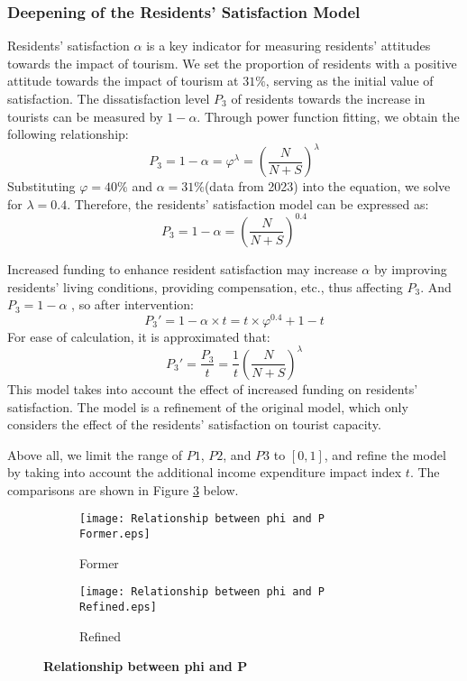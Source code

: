 \documentclass{mcmthesis}
\begin{document}
\subsubsection{Deepening of the Residents' Satisfaction Model}
{Residents' satisfaction $\alpha$ is a key indicator
for measuring residents' attitudes towards the impact of tourism. We set the
proportion of residents with a positive attitude towards the impact of
tourism at $31\%$, serving as the initial value of
satisfaction. The dissatisfaction level $P_3$ of residents towards the increase in
tourists can be measured by $1-\alpha$. Through power function fitting, we obtain
the following relationship:}
\begin{equation}
  P_3=1-\alpha=\varphi^\lambda =\left(\frac{N}{N+S}\right)^\lambda
\end{equation}
{Substituting $\varphi =40\%$ and $\alpha =31\%$(data from 2023) into the equation,
we solve for $\lambda =0.4$. Therefore, the
residents' satisfaction model can be expressed
as:}
\begin{equation}
  P_3=1-\alpha=\left(\frac{N}{N+S}\right)^{0.4}
\end{equation}

{Increased funding to enhance resident satisfaction may increase $\alpha$ by improving residents' living conditions, providing compensation, etc., thus affecting $P_3$. And $P_3=1-\alpha$ , so after intervention:}
\begin{equation}
  P_3'=1-\alpha \times t=t \times \varphi ^{0.4}+1-t
\end{equation}
{For ease of calculation, it is approximated that:}
\begin{equation}
P_3'=\frac{P_3}{t}=\frac{1}{t}\left(\frac{N}{N+S}\right)^\lambda\label{eq:p3}
\end{equation}
{This model takes into account the effect of increased funding on residents' satisfaction. The model is a refinement of the original model, which only considers the effect of the residents' satisfaction on tourist capacity.}

{Above all, we limit the range of $P1$, $P2$, and $P3$ to $[0,1]$, and refine the model by taking into account the additional income expenditure impact index $t$. The comparisons are shown in Figure \ref{fig:Figure7} below.}
\begin{figure}[htbp]
  \centering
  \begin{subfigure}[b]{0.49\textwidth}
      \texttt{[image: Relationship between phi and P Former.eps]}
      \caption{Former}
      \label{fig:former}
  \end{subfigure}
  \hfill
  \begin{subfigure}[b]{0.49\textwidth}
      \texttt{[image: Relationship between phi and P Refined.eps]}
      \caption{Refined}
      \label{fig:latter}
  \end{subfigure}
  \caption{\textbf{Relationship between phi and P}}
  \label{fig:Figure7}
\end{figure}
\end{document}
